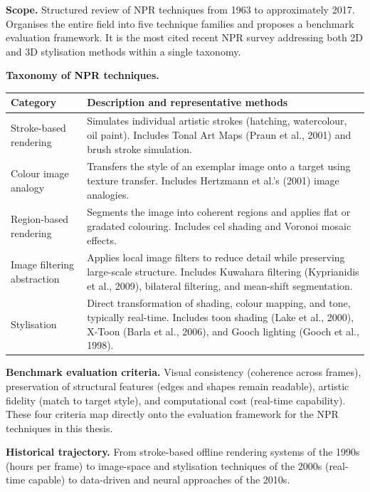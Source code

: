 \documentclass[11pt, a4paper]{article}
\begin{document}
\textbf{Scope.} Structured review of NPR techniques from 1963 to approximately 2017. Organises the entire field into five technique families and proposes a benchmark evaluation framework. It is the most cited recent NPR survey addressing both 2D and 3D stylisation methods within a single taxonomy.

\textbf{Taxonomy of NPR techniques.}

\begin{center}
\begin{tabular}{p{3.0cm}p{8.5cm}}
\toprule
\textbf{Category} & \textbf{Description and representative methods} \\
\midrule
Stroke-based rendering & Simulates individual artistic strokes (hatching, watercolour, oil paint). Includes Tonal Art Maps (Praun et al., 2001) and brush stroke simulation. \\[4pt]
Colour image analogy & Transfers the style of an exemplar image onto a target using texture transfer. Includes Hertzmann et al.'s (2001) image analogies. \\[4pt]
Region-based rendering & Segments the image into coherent regions and applies flat or gradated colouring. Includes cel shading and Voronoi mosaic effects. \\[4pt]
Image filtering abstraction & Applies local image filters to reduce detail while preserving large-scale structure. Includes Kuwahara filtering (Kyprianidis et al., 2009), bilateral filtering, and mean-shift segmentation. \\[4pt]
Stylisation & Direct transformation of shading, colour mapping, and tone, typically real-time. Includes toon shading (Lake et al., 2000), X-Toon (Barla et al., 2006), and Gooch lighting (Gooch et al., 1998). \\
\bottomrule
\end{tabular}
\end{center}

\textbf{Benchmark evaluation criteria.} Visual consistency (coherence across frames), preservation of structural features (edges and shapes remain readable), artistic fidelity (match to target style), and computational cost (real-time capability). These four criteria map directly onto the evaluation framework for the NPR techniques in this thesis.

\textbf{Historical trajectory.} From stroke-based offline rendering systems of the 1990s (hours per frame) to image-space and stylisation techniques of the 2000s (real-time capable) to data-driven and neural approaches of the 2010s.
\end{document}
